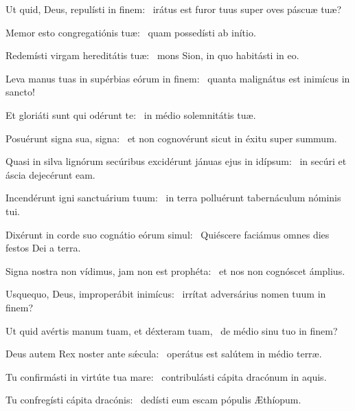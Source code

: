 \item Ut quid, Deus, repulísti in finem:~\psstar{} irátus est furor tuus super oves páscuæ tuæ?

\item Memor esto congregatiónis tuæ:~\psstar{} quam possedísti ab inítio.

\item Redemísti virgam hereditátis tuæ:~\psstar{} mons Sion, in quo habitásti in eo.

\item Leva manus tuas in supérbias eórum in finem:~\psstar{} quanta malignátus est inimícus in sancto!

\item Et gloriáti sunt qui odérunt te:~\psstar{} in médio solemnitátis tuæ.

\item Posuérunt signa sua, signa:~\psstar{} et non cognovérunt sicut in éxitu super summum.

\item Quasi in silva lignórum secúribus excidérunt jánuas ejus in idípsum:~\psstar{} in secúri et áscia dejecérunt eam.

\item Incendérunt igni sanctuárium tuum:~\psstar{} in terra polluérunt tabernáculum nóminis tui.

\item Dixérunt in corde suo cognátio eórum simul:~\psstar{} Quiéscere faciámus omnes dies festos Dei a terra.

\item Signa nostra non vídimus, jam non est prophéta:~\psstar{} et nos non cognóscet ámplius.

\item Usquequo, Deus, improperábit inimícus:~\psstar{} irrítat adversárius nomen tuum in finem?

\item Ut quid avértis manum tuam, et déxteram tuam,~\psstar{} de médio sinu tuo in finem?

\item Deus autem Rex noster ante sǽcula:~\psstar{} operátus est salútem in médio terræ.

\item Tu confirmásti in virtúte tua mare:~\psstar{} contribulásti cápita dracónum in aquis.

\item Tu confregísti cápita dracónis:~\psstar{} dedísti eum escam pópulis Æthíopum.

